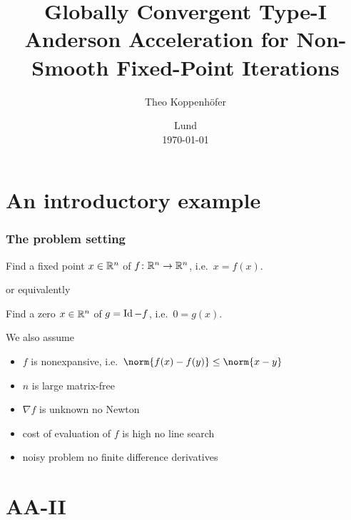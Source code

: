 %




\subject{, VT23}
\title{%
Globally Convergent Type-I Anderson Acceleration for Non-Smooth Fixed-Point Iterations}
\author{Theo Koppenhöfer}
\date{Lund \\[1ex] \today}








\frame[plain]



\frame[plain]{\titlepage}


\section{An introductory example}
\begin{frame}
	\frametitle{The problem setting}
	\begin{problem}
		Find a fixed point $x\in\mathbb{R}^n$ of $f\colon\mathbb{R}^n\to\mathbb{R}^n$, i.e.\ $x=f(x)$.
	\end{problem}
	or equivalently
	\begin{problem}
		Find a zero $x\in\mathbb{R}^n$ of $g=\operatorname{Id}-f$, i.e.\ $0=g(x)$.
	\end{problem}
	We also assume
	\begin{itemize}
		\item $f$ is nonexpansive, i.e.\ $\norm{f(x)-f(y)}\leq\norm{x-y}$
		\item $n$ is large \textrightarrow matrix-free
		\item $\nabla f$ is unknown \textrightarrow no Newton
		\item cost of evaluation of $f$ is high \textrightarrow no line search
		\item noisy problem \textrightarrow no finite difference derivatives
	\end{itemize}
\end{frame}

\section{AA-II}
